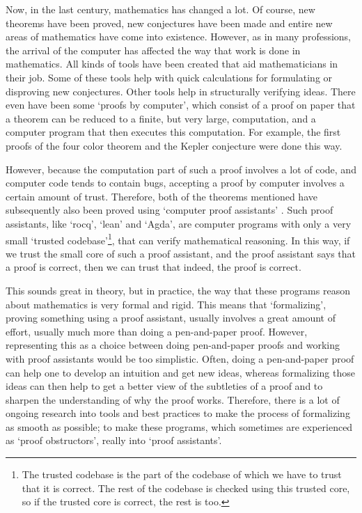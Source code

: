 Now, in the last century, mathematics has changed a lot. Of course, new theorems have been proved, new conjectures have been made and entire new areas of mathematics have come into existence. However, as in many professions, the arrival of the computer has affected the way that work is done in mathematics. All kinds of tools have been created that aid mathematicians in their job. Some of these tools help with quick calculations for formulating or disproving new conjectures. Other tools help in structurally verifying ideas. There even have been some `proofs by computer', which consist of a proof on paper that a theorem can be reduced to a finite, but very large, computation, and a computer program that then executes this computation. For example, the first proofs of the four color theorem \autocite{four-color-theorem} and the Kepler conjecture \autocite{Kepler-conjecture} were done this way.

However, because the computation part of such a proof involves a lot of code, and computer code tends to contain bugs, accepting a proof by computer involves a certain amount of trust. Therefore, both of the theorems mentioned have subsequently also been proved using `computer proof assistants' \autocite{formalized-four-color-theorem, formalized-Kepler-conjecture}. Such proof assistants, like `rocq', `lean' and `Agda', are computer programs with only a very small `trusted codebase'\footnote{The trusted codebase is the part of the codebase of which we have to trust that it is correct. The rest of the codebase is checked using this trusted core, so if the trusted core is correct, the rest is too.}, that can verify mathematical reasoning. In this way, if we trust the small core of such a proof assistant, and the proof assistant says that a proof is correct, then we can trust that indeed, the proof is correct.

This sounds great in theory, but in practice, the way that these programs reason about mathematics is very formal and rigid. This means that `formalizing', proving something using a proof assistant, usually involves a great amount of effort, usually much more than doing a pen-and-paper proof. However, representing this as a choice between doing pen-and-paper proofs and working with proof assistants would be too simplistic. Often, doing a pen-and-paper proof can help one to develop an intuition and get new ideas, whereas formalizing those ideas can then help to get a better view of the subtleties of a proof and to sharpen the understanding of why the proof works. Therefore, there is a lot of ongoing research into tools and best practices to make the process of formalizing as smooth as possible; to make these programs, which sometimes are experienced as `proof obstructors', really into `proof assistants'.

